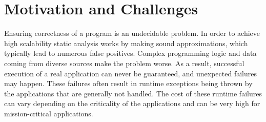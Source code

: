 
\chapter{Motivation and Challenges}
\label{chapter:motivation}

Ensuring correctness of a program is an undecidable problem. In order to achieve
high scalability static analysis works by making sound approximations, which
typically lead to numerous false positives. Complex programming logic and data
coming from diverse sources make the problem worse. As a result, successful
execution of a real application can never be guaranteed, and unexpected failures
may happen. These failures often result in runtime exceptions being thrown by
the applications that are generally not handled. The cost of these runtime
failures can vary depending on the criticality of the applications and can be
very high for mission-critical applications.

